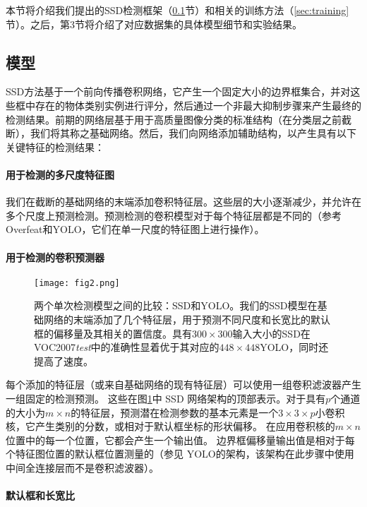 \documentclass[../main.tex]{subfile}
\begin{document}
本节将介绍我们提出的SSD检测框架（\ref{sec:model}节）和相关的训练方法（\ref{sec:training}节）。之后，第3节将介绍了对应数据集的具体模型细节和实验结果。

\subsection{模型} \label{sec:model}

SSD方法基于一个前向传播卷积网络，它产生一个固定大小的边界框集合，并对这些框中存在的物体类别实例进行评分，然后通过一个非最大抑制步骤来产生最终的检测结果。前期的网络层基于用于高质量图像分类的标准结构（在分类层之前截断），我们将其称之基础网络。然后，我们向网络添加辅助结构，以产生具有以下关键特征的检测结果：

\paragraph{用于检测的多尺度特征图}

我们在截断的基础网络的末端添加卷积特征层。这些层的大小逐渐减少，并允许在多个尺度上预测检测。预测检测的卷积模型对于每个特征层都是不同的（参考Overfeat\cite{overfeat}和YOLO\cite{yolo}，它们在单一尺度的特征图上进行操作）。

\paragraph{用于检测的卷积预测器}

\begin{figure}[htb]
    \centering
    \texttt{[image: fig2.png]}
    \caption{两个单次检测模型之间的比较：SSD和YOLO\cite{yolo}。我们的SSD模型在基础网络的末端添加了几个特征层，用于预测不同尺度和长宽比的默认框的偏移量及其相关的置信度。具有$ 300 \times 300 $输入大小的SSD在VOC2007\textit{test}中的准确性显着优于其对应的$ 448 \times 448 $YOLO，同时还提高了速度。}
    \label{fig:fig2}
\end{figure}

每个添加的特征层（或来自基础网络的现有特征层）可以使用一组卷积滤波器产生一组固定的检测预测。 这些在图\ref{fig:fig2}中 SSD 网络架构的顶部表示。对于具有$ p $个通道的大小为$ m \times n $的特征层，预测潜在检测参数的基本元素是一个$ 3 \times 3 \times p $小卷积核，它产生类别的分数，或相对于默认框坐标的形状偏移。 在应用卷积核的$ m \times n $位置中的每一个位置，它都会产生一个输出值。 边界框偏移量输出值是相对于每个特征图位置的默认框位置测量的（参见 YOLO\cite{yolo}的架构，该架构在此步骤中使用中间全连接层而不是卷积滤波器）。

\paragraph{默认框和长宽比}
\end{document}
